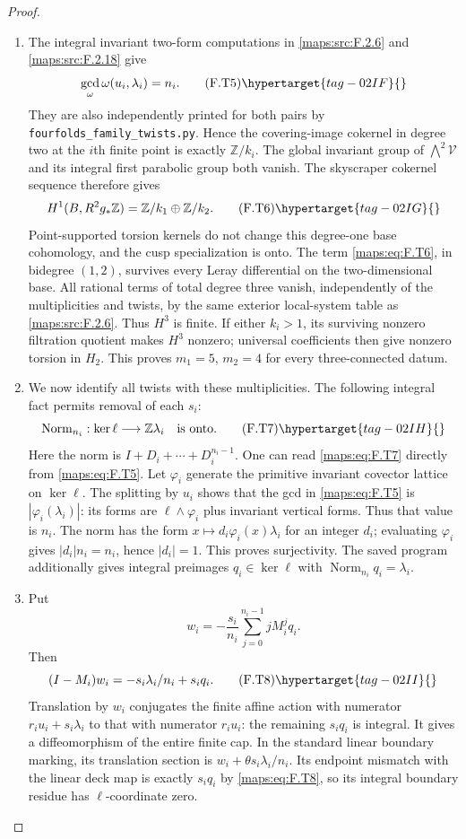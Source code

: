 \begin{proof}
\begin{enumerate}[label={$\langle1\rangle$\arabic*.}]
\item The integral invariant two-form computations in \ref{maps:src:F.2.6} and
\ref{maps:src:F.2.18} give
\[
 \gcd_{\omega}\omega(u_i,\lambda_i)=n_i.
 \tag{F.T5}\hypertarget{tag-02IF}{}\label{maps:eq:F.T5}
\]
They are also independently printed for both pairs by
\texttt{fourfolds\_family\_twists.py}.
Hence the covering-image cokernel in degree two at the
$i$th finite point is exactly $\mathbb Z/k_i$.
The global invariant group of $\bigwedge^2\mathcal V$
and its integral first parabolic group both vanish.
The skyscraper cokernel sequence therefore gives
\[
 H^1(B,R^2g_*\mathbb Z)
       =\mathbb Z/k_1\oplus\mathbb Z/k_2.
 \tag{F.T6}\hypertarget{tag-02IG}{}\label{maps:eq:F.T6}
\]
Point-supported torsion kernels do not change this degree-one
base cohomology, and the cusp specialization is onto.
The term \eqref{maps:eq:F.T6}, in bidegree $(1,2)$, survives every Leray
differential on the two-dimensional base.
All rational terms of total degree three vanish, independently
of the multiplicities and twists, by the same exterior
local-system table as \ref{maps:src:F.2.6}.  Thus $H^3$ is finite.
If either $k_i>1$, its surviving nonzero filtration quotient
makes $H^3$ nonzero; universal coefficients then give
nonzero torsion in $H_2$.
This proves $m_1=5$, $m_2=4$ for every three-connected datum.

\item We now identify all twists with these multiplicities.
The following integral fact permits removal of each $s_i$:
\[
 \operatorname{Norm}_{n_i}:
 \ker\ell\longrightarrow\mathbb Z\lambda_i
 \quad\text{is onto}.
 \tag{F.T7}\hypertarget{tag-02IH}{}\label{maps:eq:F.T7}
\]
Here the norm is $I+D_i+\cdots+D_i^{n_i-1}$.
One can read \eqref{maps:eq:F.T7} directly from \eqref{maps:eq:F.T5}.
Let $\varphi_i$ generate the primitive invariant covector
lattice on $\ker\ell$.
The splitting by $u_i$ shows that the gcd in \eqref{maps:eq:F.T5} is
$|\varphi_i(\lambda_i)|$: its forms are
$\ell\wedge\varphi_i$ plus invariant vertical forms.
Thus that value is $n_i$.
The norm has the form
$x\mapsto d_i\varphi_i(x)\lambda_i$ for an integer
$d_i$; evaluating $\varphi_i$ gives
$|d_i|n_i=n_i$, hence $|d_i|=1$.
This proves surjectivity.  The saved program additionally
gives integral preimages $q_i\in\ker\ell$ with
$\operatorname{Norm}_{n_i}q_i=\lambda_i$.

\item Put
\[
 w_i=-\frac{s_i}{n_i}\sum_{j=0}^{n_i-1}jM_i^j q_i.
\]
Then
\[
 (I-M_i)w_i=-s_i\lambda_i/n_i+s_iq_i.
 \tag{F.T8}\hypertarget{tag-02II}{}\label{maps:eq:F.T8}
\]
Translation by $w_i$ conjugates the finite affine action
with numerator $r_i u_i+s_i\lambda_i$ to that with
numerator $r_i u_i$: the remaining $s_iq_i$ is integral.
It gives a diffeomorphism of the entire finite cap.
In the standard linear boundary marking, its translation
section is
$w_i+\theta s_i\lambda_i/n_i$.
Its endpoint mismatch with the linear deck map is exactly
$s_iq_i$ by \eqref{maps:eq:F.T8}, so its integral boundary residue has
$\ell$-coordinate zero.


\end{enumerate}
\end{proof}
